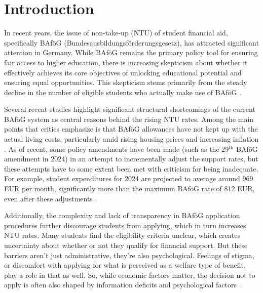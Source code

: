 %
%

\section{Introduction} \label{sec:intro}

In recent years, the issue of non-take-up (NTU) of student financial aid, specifically BAföG (Bundesausbildungsförderungsgesetz), has attracted significant attention in Germany. While BAföG remains the primary policy tool for ensuring fair access to higher education, there is increasing skepticism about whether it effectively achieves its core objectives of unlocking educational potential and ensuring equal opportunities. This skepticism stems primarily from the steady decline in the number of eligible students who actually make use of BAföG \citep{gwosc_krisenbewaltigung_2022, meier_bafog_2024}.

Several recent studies highlight significant structural shortcomings of the current BAföG system as central reasons behind the rising NTU rates. Among the main points that critics emphasize is that BAföG allowances have not kept up with the actual living costs, particularly amid rising housing prices and increasing inflation \citep{meier_bafog_2024, meier_zur_2024, staack_von_2017, gwosc_krisenbewaltigung_2022}. As of recent, some policy amendments have been made (such as the 29\( ^{\text{th} } \) BAföG amendment in 2024) in an attempt to incrementally adjust the support rates, but these attempts have to some extent been met with criticism for being inadequate. For example, student expenditures for 2024 are projected to average around 969 EUR per month, significantly more than the maximum BAföG rate of 812 EUR, even after these adjustments \citep{meier_bafog_2024}.


Additionally, the complexity and lack of transparency in BAföG application procedures further discourage students from applying, which in turn increases NTU rates. Many students find the eligibility criteria unclear, which creates uncertainty about whether or not they qualify for financial support. But these barriers aren’t just administrative, they’re also psychological. Feelings of stigma, or discomfort with applying for what is perceived as a welfare type of benefit, play a role in that as well. So, while economic factors matter, the decision not to apply is often also shaped by information deficits and psychological factors \citep{gwosc_krisenbewaltigung_2022, staack_von_2017}.


